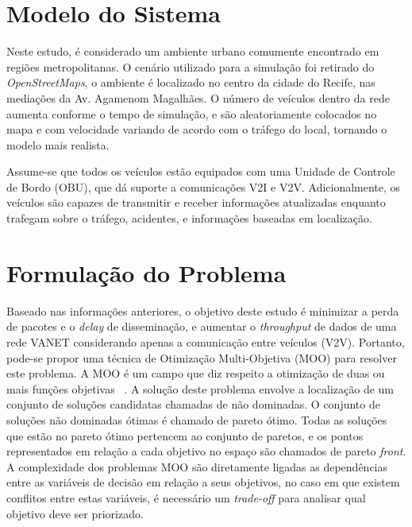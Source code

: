 \documentclass[conference]{IEEEtran}
\begin{document}
\section{Modelo do Sistema}

Neste estudo, é considerado um ambiente urbano comumente encontrado em regiões metropolitanas. O cenário utilizado para a simulação foi retirado do \textit{OpenStreetMaps}, o ambiente é localizado no centro da cidade do Recife, nas mediações da Av. Agamenom Magalhães. O número de veículos dentro da rede aumenta conforme o tempo de simulação, e são aleatoriamente colocados no mapa e com velocidade variando de acordo com o tráfego do local, tornando o modelo mais realista. %



Assume-se que todos os veículos estão equipados com uma Unidade de Controle de Bordo (OBU), que dá suporte a comunicações V2I e V2V. Adicionalmente, os veículos são capazes de transmitir e receber informações atualizadas enquanto trafegam sobre o tráfego, acidentes, e informações baseadas em localização.

\section{Formulação do Problema}
\label{sec:form-problema}

Baseado nas informações anteriores, o objetivo deste estudo é minimizar a perda de pacotes e o \textit{delay} de disseminação, e aumentar o \textit{throughput} de dados de uma rede VANET considerando apenas a comunicação entre veículos (V2V). Portanto, pode-se propor uma técnica de Otimização Multi-Objetiva (MOO) para resolver este problema. A MOO é um campo que diz respeito a otimização de duas ou mais funções objetivas ~\cite{Brownlee:2011}. A solução deste problema envolve a localização de um conjunto de soluções candidatas chamadas de não dominadas. O conjunto de soluções não dominadas ótimas é chamado de pareto ótimo. Todas as soluções que estão no pareto ótimo pertencem ao conjunto de paretos, e os pontos representados em relação a cada objetivo no espaço são chamados de pareto \textit{front}. A complexidade dos problemas MOO são diretamente ligadas as dependências entre as variáveis de decisão em relação a seus objetivos, no caso em que existem conflitos entre estas variáveis, é necessário um \textit{trade-off} para analisar qual objetivo deve ser priorizado.
\end{document}
